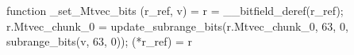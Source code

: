 function _set_Mtvec_bits (r_ref, v) = {
    r = __bitfield_deref(r_ref);
    r.Mtvec_chunk_0 = update_subrange_bits(r.Mtvec_chunk_0, 63, 0, subrange_bits(v, 63, 0));
    (*r_ref) = r
}

